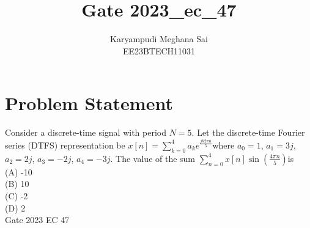 \documentclass[12pt]{article}
\title{Gate 2023\_ec\_47}
\author{Karyampudi Meghana Sai \\
        EE23BTECH11031}
\begin{document}
\maketitle

\section*{Problem Statement}

Consider a discrete-time signal with period $N=5$. Let the discrete-time Fourier series (DTFS) representation be $ x[n] = \sum\limits_{k=0}^{4} a_k e^{\frac{jk2\pi n}{5}} $where $a_0=1$, $a_1=3j$, $a_2=2j$, $a_3=-2j$, $a_4=-3j$. The value of the sum $\sum\limits_{n=0}^{4}x[n] \sin\left(\frac{4\pi n}{5}\right) $is\\
(A) -10\\
(B) 10\\
(C) -2\\
(D) 2\\
\hfill Gate 2023 EC 47
\end{document}
